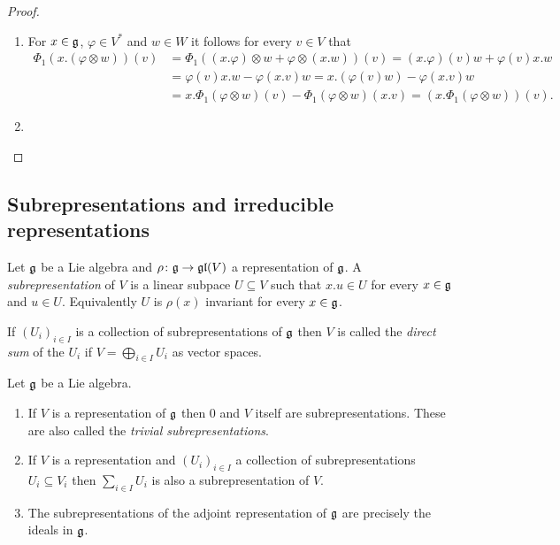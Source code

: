 \begin{proof}
 \begin{enumerate}[leftmargin=*]
  \item
   For $x \in \mathfrak{g}$, $\varphi \in V^*$ and $w \in W$ it follows for every $v \in V$ that
   \begin{align*}
    \Phi_1(x.(\varphi \otimes w))(v)
    &= \Phi_1((x.\varphi) \otimes w + \varphi \otimes (x.w))(v)
    = (x.\varphi)(v) w + \varphi(v) x.w \\
    &= \varphi(v) x.w -\varphi(x.v) w
    = x.(\varphi(v) w) - \varphi(x.v) w \\
    &= x.\Phi_1(\varphi \otimes w)(v) - \Phi_1(\varphi \otimes w)(x.v)
    = (x.\Phi_1(\varphi \otimes w))(v).
   \end{align*}
  
  \item
   
 \end{enumerate}
\end{proof}






\subsection{Subrepresentations and irreducible representations}


\begin{defi}
 Let $\mathfrak{g}$ be a Lie algebra and $\rho \colon \mathfrak{g} \to \mathfrak{gl}(V)$ a representation of $\mathfrak{g}$. A \emph{subrepresentation} of $V$ is a linear subpace $U \subseteq V$ such that $x.u \in U$ for every $x \in \mathfrak{g}$ and $u \in U$. Equivalently $U$ is $\rho(x)$ invariant for every $x \in \mathfrak{g}$.
 
 If $(U_i)_{i \in I}$ is a collection of subrepresentations of $\mathfrak{g}$ then $V$ is called the \emph{direct sum} of the $U_i$ if $V = \bigoplus_{i \in I} U_i$ as vector spaces.
\end{defi}


\begin{expls}
 Let $\mathfrak{g}$ be a Lie algebra.
 \begin{enumerate}[leftmargin=*]
  \item
   If $V$ is a representation of $\mathfrak{g}$ then $0$ and $V$ itself are subrepresentations. These are also called the \emph{trivial subrepresentations}.
  \item
   If $V$ is a representation and $(U_i)_{i \in I}$ a collection of subrepresentations $U_i \subseteq V_i$ then $\sum_{i \in I} U_i$ is also a subrepresentation of $V$.
  \item
   The subrepresentations of the adjoint representation of $\mathfrak{g}$ are precisely the ideals in $\mathfrak{g}$.
 \end{enumerate}
\end{expls}


